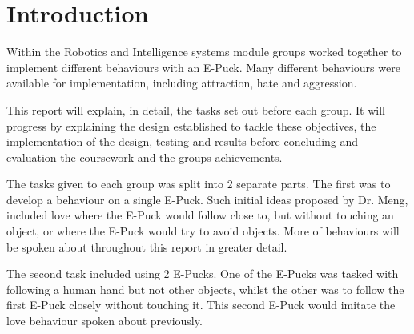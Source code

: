 \section{Introduction} \label{sec:intro}
Within the Robotics and Intelligence systems module groups worked together to implement different behaviours with an E-Puck. Many different behaviours were available for implementation, including attraction, hate and aggression.

This report will explain, in detail, the tasks set out before each group. It will progress by explaining the design established to tackle these objectives, the implementation of the design, testing and results before concluding and evaluation the coursework and the groups achievements.

The tasks given to each group was split into 2 separate parts. The first was to develop a behaviour on a single E-Puck. Such initial ideas proposed by Dr. Meng, included love where the E-Puck would follow close to, but without touching an object, or where the E-Puck would try to avoid objects. More of behaviours will be spoken about throughout this report in greater detail.

The second task included using 2 E-Pucks. One of the E-Pucks was tasked with following a human hand but not other objects, whilst the other was to follow the first E-Puck closely without touching it. This second E-Puck would imitate the love behaviour spoken about previously.